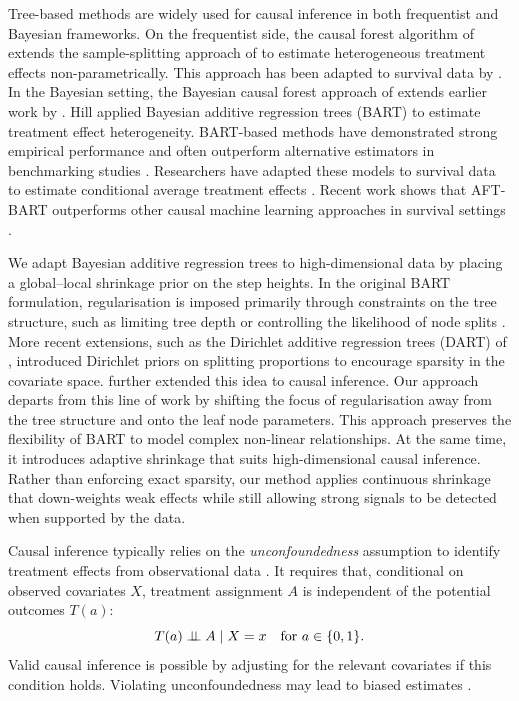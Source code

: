 Tree-based methods are widely used for causal inference in both frequentist and Bayesian frameworks. 
On the frequentist side, the causal forest algorithm of \citet{Wager2018CausalForest} extends the sample-splitting approach of \citet{Athey2016CausalTrees} to estimate heterogeneous treatment effects non-parametrically. 
This approach has been adapted to survival data by \citet{Cui2023CausalSurvivalForest}. 
In the Bayesian setting, the Bayesian causal forest approach of \citet{hahn2020bayesian} extends earlier work by \citet{Hill2011}. 
Hill applied Bayesian additive regression trees (BART) \citep{BARToriginal} to estimate treatment effect heterogeneity.
BART-based methods have demonstrated strong empirical performance and often outperform alternative estimators in benchmarking studies \citep{Dorie2019CausalCompetition, Thal2023ACIC}. 
Researchers have adapted these models to survival data to estimate conditional average treatment effects \citep{Bonato2011BayesianEnsemble, henderson2020individualized, Hu2023FlexibleCausal, Sun2025AFTCure}.
Recent work shows that AFT-BART \citep{henderson2020individualized} outperforms other causal machine learning approaches in survival settings \citep{Hu2021HeterogeneousSurvival}.

We adapt Bayesian additive regression trees to high-dimensional data by placing a global--local shrinkage prior on the step heights.
In the original BART formulation, regularisation is imposed primarily through constraints on the tree structure, such as limiting tree depth or controlling the likelihood of node splits \citep{BARToriginal}.
More recent extensions, such as the Dirichlet additive regression trees (DART) of \citet{linero2018dirichlet}, introduced Dirichlet priors on splitting proportions to encourage sparsity in the covariate space.
\citet{caron2022shrinkage} further extended this idea to causal inference. 
Our approach departs from this line of work by shifting the focus of regularisation away from the tree structure and onto the leaf node parameters.
This approach preserves the flexibility of BART to model complex non-linear relationships. 
At the same time, it introduces adaptive shrinkage that suits high-dimensional causal inference. 
Rather than enforcing exact sparsity, our method applies continuous shrinkage that down-weights weak effects while still allowing strong signals to be detected when supported by the data.


Causal inference typically relies on the \textit{unconfoundedness} assumption to identify treatment effects from observational data \citep{ImbensRubin2015}.
It requires that, conditional on observed covariates $X$, treatment assignment $A$ is independent of the potential outcomes $T(a)$:
\begin{equation}\label{unconfoundedness}
T(a) \perp\!\!\!\perp A \mid X = x \quad \text{for } a \in \{0, 1\}.
\end{equation}
Valid causal inference is possible by adjusting for the relevant covariates if this condition holds.
Violating unconfoundedness may lead to biased estimates \citep{Chernozhukov2022OVBCML}.

